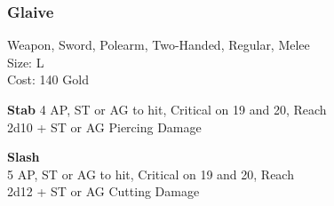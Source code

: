 \subsubsection{Glaive}\label{weapon:glaive}
Weapon, Sword, Polearm, Two-Handed, Regular, Melee\\
Size: L\\
Cost: 140 Gold

\textbf{Stab}
4 AP, ST or AG to hit, Critical on 19 and 20,  Reach\\
2d10 + \texttimes ST or AG Piercing Damage

\textbf{Slash}\\
5 AP, ST or AG to hit, Critical on 19 and 20,  Reach\\
2d12 + \texttimes ST or AG Cutting Damage

